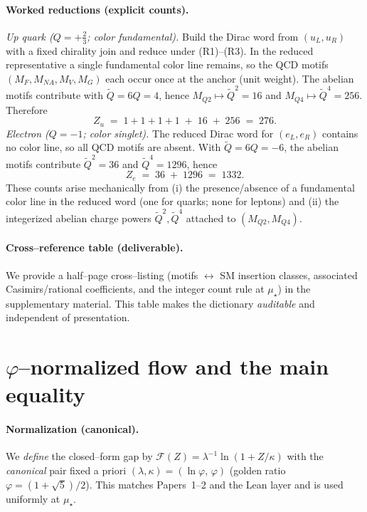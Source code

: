 \documentclass[epjc3]{svjour3}
\begin{document}
\paragraph{Worked reductions (explicit counts).}
\emph{Up quark ($Q=+\tfrac{2}{3}$; color fundamental).} Build the Dirac word from $(u_L,u_R)$ with a fixed chirality join and reduce under (R1)--(R3). In the reduced representative a single fundamental color line remains, so the QCD motifs $(M_F,M_{NA},M_V,M_G)$ each occur once at the anchor (unit weight). The abelian motifs contribute with $\tilde Q=6Q=4$, hence $M_{Q2}\mapsto \tilde Q^2=16$ and $M_{Q4}\mapsto \tilde Q^4=256$. Therefore
\[
  Z_u\;=\;1+1+1+1\;+\;16\;+\;256\;=\;276.
\]
\emph{Electron ($Q=-1$; color singlet).} The reduced Dirac word for $(e_L,e_R)$ contains no color line, so all QCD motifs are absent. With $\tilde Q=6Q=-6$, the abelian motifs contribute $\tilde Q^2=36$ and $\tilde Q^4=1296$, hence
\[
  Z_e\;=\;36\;+\;1296\;=\;1332.
\]
These counts arise mechanically from (i) the presence/absence of a fundamental color line in the reduced word (one for quarks; none for leptons) and (ii) the integerized abelian charge powers $\tilde Q^2,\tilde Q^4$ attached to $(M_{Q2},M_{Q4})$.

\paragraph{Cross--reference table (deliverable).}
We provide a half--page cross--listing (motifs $\leftrightarrow$ SM insertion classes, associated Casimirs/rational coefficients, and the integer count rule at $\mu_\star$) in the supplementary material.  This table makes the dictionary \emph{auditable} and independent of presentation.


\section{$\varphi$--normalized flow and the main equality}

\paragraph{Normalization (canonical).}
We \emph{define} the closed--form gap by
\(
\mathcal F(Z)=\lambda^{-1}\ln(1+Z/\kappa)
\)
with the \emph{canonical} pair fixed a priori
\(
(\lambda,\kappa)=(\ln\varphi,\,\varphi)
\)
(golden ratio $\varphi=(1+\sqrt5)/2$). This matches Papers~1--2 and the Lean layer and is used uniformly at $\mu_\star$.
\end{document}
